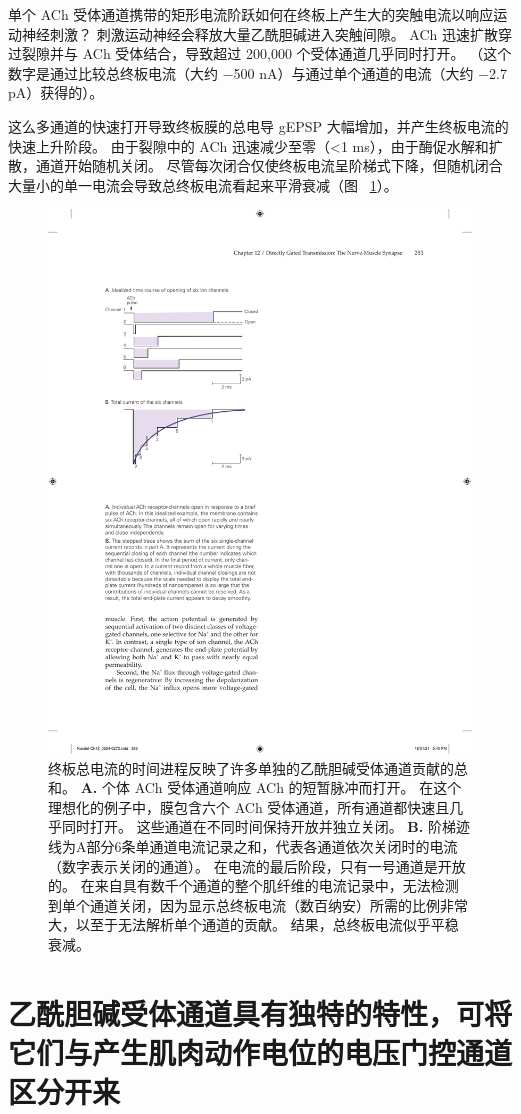 单个 ACh 受体通道携带的矩形电流阶跃如何在终板上产生大的突触电流以响应运动神经刺激？
刺激运动神经会释放大量乙酰胆碱进入突触间隙。
ACh 迅速扩散穿过裂隙并与 ACh 受体结合，导致超过 200,000 个受体通道几乎同时打开。
（这个数字是通过比较总终板电流（大约 −500 nA）与通过单个通道的电流（大约 −2.7 pA）获得的）。


这么多通道的快速打开导致终板膜的总电导 gEPSP 大幅增加，并产生终板电流的快速上升阶段。
由于裂隙中的 ACh 迅速减少至零（<1 ms），由于酶促水解和扩散，通道开始随机关闭。
尽管每次闭合仅使终板电流呈阶梯式下降，但随机闭合大量小的单一电流会导致总终板电流看起来平滑衰减（图 ~\ref{fig:12_8}）。


\begin{figure}[htbp]
	\centering
	\includegraphics[width=0.5\linewidth]{chap12/fig_12_8}
	\caption{终板总电流的时间进程反映了许多单独的乙酰胆碱受体通道贡献的总和\cite{colquhoun1981fast}。
		\textbf{A.} 个体 ACh 受体通道响应 ACh 的短暂脉冲而打开。
		在这个理想化的例子中，膜包含六个 ACh 受体通道，所有通道都快速且几乎同时打开。
		这些通道在不同时间保持开放并独立关闭。
		\textbf{B.} 阶梯迹线为A部分6条单通道电流记录之和，代表各通道依次关闭时的电流（数字表示关闭的通道）。
		在电流的最后阶段，只有一号通道是开放的。
		在来自具有数千个通道的整个肌纤维的电流记录中，无法检测到单个通道关闭，因为显示总终板电流（数百纳安）所需的比例非常大，以至于无法解析单个通道的贡献。
		结果，总终板电流似乎平稳衰减。}
	\label{fig:12_8}
\end{figure}



\section{乙酰胆碱受体通道具有独特的特性，可将它们与产生肌肉动作电位的电压门控通道区分开来}

